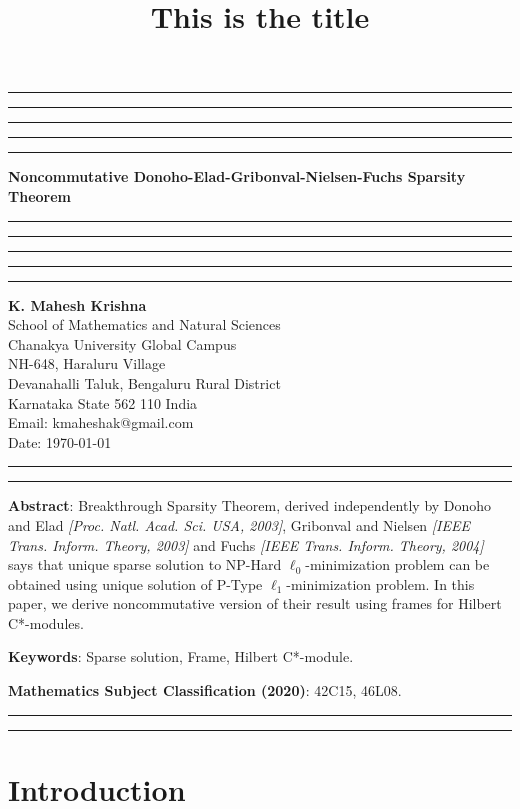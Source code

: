 \documentclass{amsart}
\title{This is the title}
\begin{document}
\hrule\hrule\hrule\hrule\hrule
\vspace{0.3cm}	
\begin{center}
{\bf\large{{Noncommutative Donoho-Elad-Gribonval-Nielsen-Fuchs Sparsity Theorem}}}\\
\vspace{0.3cm}
\hrule\hrule\hrule\hrule\hrule
\vspace{0.3cm}
\textbf{K. Mahesh Krishna}\\
School of Mathematics and Natural Sciences\\
Chanakya University Global Campus\\
NH-648, Haraluru Village\\
Devanahalli Taluk, 	Bengaluru  Rural District\\
Karnataka State 562 110 India\\
Email: kmaheshak@gmail.com\\

Date: \today
\end{center}

\hrule\hrule
\vspace{0.5cm}
\textbf{Abstract}: Breakthrough Sparsity Theorem, derived  independently by Donoho and Elad   \textit{[Proc. Natl. Acad. Sci. USA, 2003]},  Gribonval and Nielsen \textit{[IEEE Trans. Inform. Theory, 2003]} and Fuchs \textit{[IEEE Trans. Inform. Theory, 2004]}  says that unique  sparse solution to NP-Hard $\ell_0$-minimization problem can be obtained using unique solution of P-Type $\ell_1$-minimization problem. In this paper, we derive noncommutative version of their result using frames for Hilbert C*-modules. 



\textbf{Keywords}:  Sparse solution, Frame, Hilbert C*-module.

\textbf{Mathematics Subject Classification (2020)}: 42C15, 46L08.\\

\hrule


\hrule
\section{Introduction}
\end{document}
